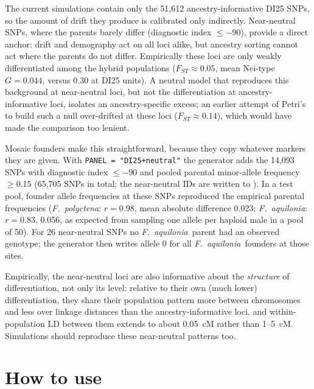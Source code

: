 \documentclass[11pt,a4paper]{article}
\newcommand{\Fa}{\textit{F.~aquilonia}}
\newcommand{\Fp}{\textit{F.~polyctena}}
\begin{document}
The current simulations contain only the 51,612 ancestry-informative DI25 SNPs, so the amount of drift they produce is calibrated only indirectly. Near-neutral SNPs, where the parents barely differ (diagnostic index $\leq-90$), provide a direct anchor: drift and demography act on all loci alike, but ancestry sorting cannot act where the parents do not differ. Empirically these loci are only weakly differentiated among the hybrid populations ($F_{ST}\approx0.05$, mean Nei-type $G=0.044$, versus 0.30 at DI25 units). A neutral model that reproduces this background at near-neutral loci, but not the differentiation at ancestry-informative loci, isolates an ancestry-specific excess; an earlier attempt of Petri's to build such a null over-drifted at these loci ($F_{ST}\approx0.14$), which would have made the comparison too lenient.

Mosaic founders make this straightforward, because they copy whatever markers they are given. With \texttt{PANEL = "DI25+neutral"} the generator adds the 14,093 SNPs with diagnostic index $\leq-90$ and pooled parental minor-allele frequency $\geq0.15$ (65,705 SNPs in total; the near-neutral IDs are written to ). In a test pool, founder allele frequencies at these SNPs reproduced the empirical parental frequencies (\Fp: $r=0.98$, mean absolute difference 0.023; \Fa: $r=0.83$, 0.056, as expected from sampling one allele per haploid male in a pool of 50). For 26 near-neutral SNPs no \Fa\ parent had an observed genotype; the generator then writes allele 0 for all \Fa\ founders at those sites.

Empirically, the near-neutral loci are also informative about the \emph{structure} of differentiation, not only its level: relative to their own (much lower) differentiation, they share their population pattern more between chromosomes and less over linkage distances than the ancestry-informative loci, and within-population LD between them extends to about 0.05~cM rather than 1--5~cM. Simulations should reproduce these near-neutral patterns too.

\section{How to use}
\end{document}

